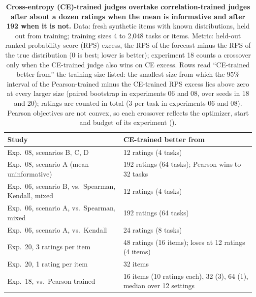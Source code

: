 \begin{table}[t]
\caption{\textbf{Cross-entropy (CE)-trained judges overtake correlation-trained judges after about a dozen ratings when the mean is informative and after 192 when it is not.}
Data: fresh synthetic items with known distributions, held out from training; training sizes 4 to 2,048 tasks or items.
Metric: held-out ranked probability score (RPS) excess, the RPS of the forecast minus the RPS of the true distribution (0 is best; lower is better); experiment 18 counts a crossover only when the CE-trained judge also wins on CE excess.
Rows read ``CE-trained better from'' the training size listed: the smallest size from which the 95\% interval of the Pearson-trained minus the CE-trained RPS excess lies above zero at every larger size (paired bootstrap in experiments 06 and 08, over seeds in 18 and 20); ratings are counted in total (3 per task in experiments 06 and 08).
Pearson objectives are not convex, so each crossover reflects the optimizer, start and budget of its experiment ().}
\label{tab:controlled}
\centering\small
\begin{tabular}{@{}p{}p{}@{}}
\toprule
Study & CE-trained better from \\
\midrule
Exp.\ 08, scenarios B, C, D & 12 ratings (4 tasks) \\
Exp.\ 08, scenario A (mean uninformative) & 192 ratings (64 tasks); Pearson wins to 32 tasks \\
Exp.\ 06, scenario B, vs.\ Spearman, Kendall, mixed & 12 ratings (4 tasks) \\
Exp.\ 06, scenario A, vs.\ Spearman, mixed & 192 ratings (64 tasks) \\
Exp.\ 06, scenario A, vs.\ Kendall & 24 ratings (8 tasks) \\
Exp.\ 20, 3 ratings per item & 48 ratings (16 items); loses at 12 ratings (4 items) \\
Exp.\ 20, 1 rating per item & 32 items \\
Exp.\ 18, vs.\ Pearson-trained & 16 items (10 ratings each), 32 (3), 64 (1), median over 12 settings \\
\bottomrule
\end{tabular}
\end{table}

